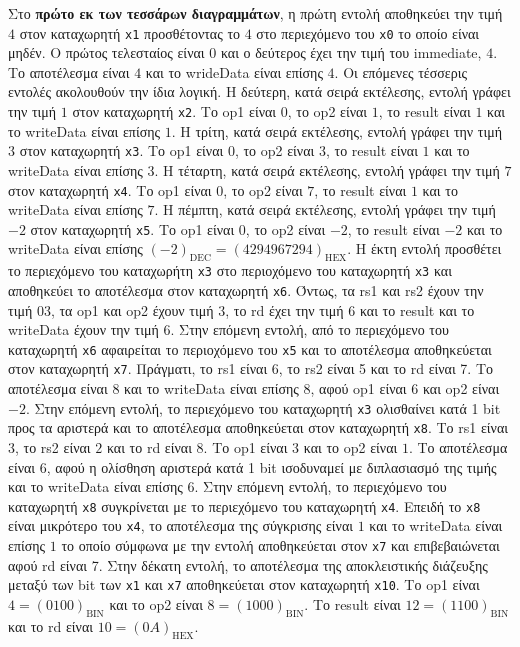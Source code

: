 Στο \textbf{πρώτο εκ των τεσσάρων διαγραμμάτων}, η πρώτη εντολή αποθηκεύει την τιμή $4$ στον καταχωρητή \texttt{x1} προσθέτοντας το $4$ στο περιεχόμενο του \texttt{x0} το οποίο είναι μηδέν. Ο πρώτος τελεσταίος είναι $0$ και ο δεύτερος έχει την τιμή του immediate, $4$. Το αποτέλεσμα είναι $4$ και το wrideData είναι επίσης $4$. Οι επόμενες τέσσερις εντολές ακολουθούν την ίδια λογική. Η δεύτερη, κατά σειρά εκτέλεσης, εντολή γράφει την τιμή $1$ στον καταχωρητή \texttt{x2}. Το op1 είναι $0$, το op2 είναι $1$, το result είναι $1$ και το writeData είναι επίσης $1$. Η τρίτη, κατά σειρά εκτέλεσης, εντολή γράφει την τιμή $3$ στον καταχωρητή \texttt{x3}. Το op1 είναι $0$, το op2 είναι $3$, το result είναι $1$ και το writeData είναι επίσης $3$. Η τέταρτη, κατά σειρά εκτέλεσης, εντολή γράφει την τιμή $7$ στον καταχωρητή \texttt{x4}. Το op1 είναι $0$, το op2 είναι $7$, το result είναι $1$ και το writeData είναι επίσης $7$. Η πέμπτη, κατά σειρά εκτέλεσης, εντολή γράφει την τιμή $-2$ στον καταχωρητή \texttt{x5}. Το op1 είναι $0$, το op2 είναι $-2$, το result είναι $-2$ και το writeData είναι επίσης $(-2)_\mathrm{DEC}=(4294967294)_\mathrm{HEX}$.
Η έκτη εντολή προσθέτει το περιεχόμενο του καταχωρήτη \texttt{x3} στο περιοχόμενο του καταχωρητή \texttt{x3} και αποθηκεύει το αποτέλεσμα στον καταχωρητή \texttt{x6}. Όντως, τα rs1 και rs2 έχουν την τιμή $03$, τα op1 και op2 έχουν τιμή $3$, το rd έχει την τιμή $6$ και το result και το writeData έχουν την τιμή $6$. Στην επόμενη εντολή, από το περιεχόμενο του καταχωρητή \texttt{x6} αφαιρείται το περιοχόμενο του \texttt{x5} και το αποτέλεσμα αποθηκεύεται στον καταχωρητή \texttt{x7}. Πράγματι, το rs1 είναι 6, το rs2 είναι 5 και το rd είναι 7. Το αποτέλεσμα είναι $8$ και το writeData είναι επίσης $8$, αφού op1 είναι $6$ και op2 είναι $-2$. Στην επόμενη εντολή, το περιεχόμενο του καταχωρητή \texttt{x3} ολισθαίνει κατά 1 bit προς τα αριστερά και το αποτέλεσμα αποθηκεύεται στον καταχωρητή \texttt{x8}. Το rs1 είναι $3$, το rs2 είναι $2$ και το rd είναι $8$. Το op1 είναι $3$ και το op2 είναι $1$. Το αποτέλεσμα είναι $6$, αφού η ολίσθηση αριστερά κατά 1 bit ισοδυναμεί με διπλασιασμό της τιμής και το writeData είναι επίσης $6$. Στην επόμενη εντολή, το περιεχόμενο του καταχωρητή \texttt{x8} συγκρίνεται με το περιεχόμενο του καταχωρητή \texttt{x4}. Επειδή το \texttt{x8} είναι μικρότερο του \texttt{x4}, το αποτέλεσμα της σύγκρισης είναι $1$ και το writeData είναι επίσης $1$ το οποίο σύμφωνα με την εντολή αποθηκεύεται στον \texttt{x7} και επιβεβαιώνεται αφού rd είναι 7. Στην δέκατη εντολή, το αποτέλεσμα της αποκλειστικής διάζευξης μεταξύ των bit των \texttt{x1} και \texttt{x7} αποθηκεύεται στον καταχωρητή \texttt{x10}. Το op1 είναι $4=(0100)_\mathrm{BIN}$ και το op2 είναι $8=(1000)_\mathrm{BIN}$. Το result είναι $12=(1100)_\mathrm{BIN}$ και το rd είναι $10=(0Α)_\mathrm{ΗΕΧ}$.\par
